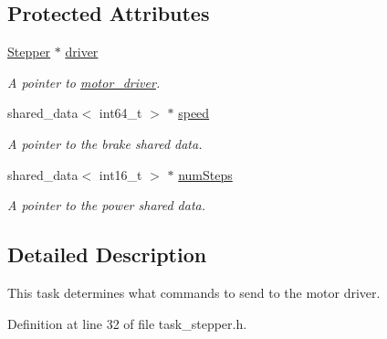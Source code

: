 \subsection*{\-Protected \-Attributes}
\begin{DoxyCompactItemize}
\item 
\hypertarget{classtask__stepper_a9f3b42028d008161f2304978a6ef3bb8}{\hyperlink{classStepper}{\-Stepper} $\ast$ \hyperlink{classtask__stepper_a9f3b42028d008161f2304978a6ef3bb8}{driver}}\label{classtask__stepper_a9f3b42028d008161f2304978a6ef3bb8}

\begin{DoxyCompactList}\small\item\em \-A pointer to \hyperlink{classmotor__driver}{motor\-\_\-driver}. \end{DoxyCompactList}\item 
\hypertarget{classtask__stepper_a5a18c729cad2a9ee878f9b2a2b210a67}{shared\-\_\-data$<$ int64\-\_\-t $>$ $\ast$ \hyperlink{classtask__stepper_a5a18c729cad2a9ee878f9b2a2b210a67}{speed}}\label{classtask__stepper_a5a18c729cad2a9ee878f9b2a2b210a67}

\begin{DoxyCompactList}\small\item\em \-A pointer to the brake shared data. \end{DoxyCompactList}\item 
\hypertarget{classtask__stepper_a615e35d33e27e664c1562b46754408d6}{shared\-\_\-data$<$ int16\-\_\-t $>$ $\ast$ \hyperlink{classtask__stepper_a615e35d33e27e664c1562b46754408d6}{num\-Steps}}\label{classtask__stepper_a615e35d33e27e664c1562b46754408d6}

\begin{DoxyCompactList}\small\item\em \-A pointer to the power shared data. \end{DoxyCompactList}\end{DoxyCompactItemize}


\subsection{\-Detailed \-Description}
\-This task determines what commands to send to the motor driver. 

\-Definition at line 32 of file task\-\_\-stepper.\-h.




